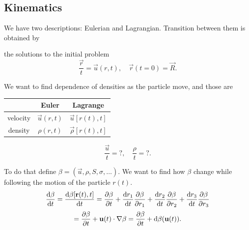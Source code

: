   
  \subsection{Kinematics}

  We have two descriptions: Eulerian and Lagrangian.
  Transition between them is obtained by

  \begin{figure}
    \centering
    \label{fig:1.7}
  \end{figure}

  

  the solutions to the initial problem
  \begin{displaymath}
    \dfrac{\vec r}{t} = \vec u(r,t), \quad \vec r(t = 0) = \vec R.
  \end{displaymath}

  We want to find dependence of densities as the particle move, and those are
  \begin{center}
    \begin{tabular}{c|c|c|}
      & Euler & Lagrange \\
      \hline
      velocity & $\vec u(r, t) $ & $\vec u[ r(t), t]$\\
      density & $\rho(r, t)$ & $\vec \rho[ r(t), t]$\\
      \hline
    \end{tabular}
  \end{center}
  \begin{displaymath}
    \dfrac{\vec u}{t} = ?, \quad \dfrac{\rho}{t} = ?.
  \end{displaymath}
  
  To do that define $\beta = (\vec u, \rho, S, \sigma, \dots)$. 
  We want to find how $\beta$ change while following the motion 
  of the particle $r(t)$.
  \begin{displaymath}
    \frac{\mathrm{d} \beta}{\mathrm{d} t} = \frac{\mathrm{d} \beta[\mathbf{r}(t),t]}{\mathrm{d} t} = \frac{\partial \beta}{\partial t} + \frac{\mathrm{d} r_1 }{\mathrm{d} t} \frac{\partial \beta}{\partial r_1} 
    + \frac{\mathrm{d} r_2}{\mathrm{d} t} \frac{\partial \beta}{\partial r_2} 
    + \frac{\mathrm{d} r_3}{\mathrm{d} t} \frac{\partial \beta}{\partial r_3}  
  \end{displaymath}
  \begin{displaymath}
    = \frac{\partial \beta}{\partial t} + \mathbf{u} (t)\cdot \nabla \beta 
    = \frac{\partial \beta}{\partial t} + \mathrm{d} \beta(\mathbf{u}(t)).
  \end{displaymath}

